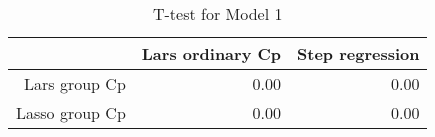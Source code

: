 \begin{table}[ht]
\centering
\begin{tabular}{rrr}
  \hline
 & Lars ordinary Cp & Step regression \\ 
  \hline
Lars group Cp & 0.00 & 0.00 \\ 
  Lasso group Cp & 0.00 & 0.00 \\ 
   \hline
\end{tabular}
\caption{T-test for Model 1} 
\end{table}
